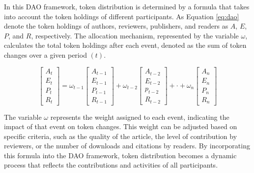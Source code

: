 \documentclass[lettersize,journal]{IEEEtran}
\begin{document}
%



In this DAO framework, token distribution is determined by a formula that takes into account the token holdings of different participants. As Equation \ref{eq:dao} denote the token holdings of authors, reviewers, publishers, and readers as $A$, $E$, $P$, and $R$, respectively. The allocation mechanism, represented by the variable $\omega$, calculates the total token holdings after each event, denoted as the sum of token changes over a given period $(t)$.


\begin{equation}
  \begin{bmatrix}
    A_t \\
    E_t \\
    P_t \\
    R_t 
  \end{bmatrix}
  = 
  \omega_{t-1}
  \begin{bmatrix}
    A_{t-1} \\
    E_{t-1} \\
    P_{t-1} \\
    R_{t-1}
  \end{bmatrix}
  +
  \omega_{t-2}
  \begin{bmatrix}
    A_{t-2} \\
    E_{t-2} \\
    p_{t-2} \\
    R_{t-2}
  \end{bmatrix}
  +
  \cdot
  + 
  \omega_n
  \begin{bmatrix}
    A_n \\
    E_n \\
    P_n \\
    R_n
  \end{bmatrix}
  \label{eq:dao}
\end{equation}



The variable $\omega$ represents the weight assigned to each event, indicating the impact of that event on token changes. This weight can be adjusted based on specific criteria, such as the quality of the article, the level of contribution by reviewers, or the number of downloads and citations by readers.
By incorporating this formula into the DAO framework, token distribution becomes a dynamic process that reflects the contributions and activities of all participants. 
\end{document}
